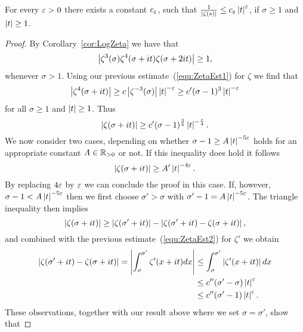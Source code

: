 \begin{proposition}
	For every $\varepsilon > 0$ there exists a constant $c_\varepsilon$, such that $\frac{1}{\left|\zeta(s)\right|} \leq c_\varepsilon \left|t\right|^\varepsilon$, if $\sigma \geq 1$ and $\left|t\right| \geq 1$.
\end{proposition}
\begin{proof}
	By Corollary~\ref{cor:LogZeta} we have that
\begin{equation*}
	\left|\zeta^3(\sigma) \zeta^4(\sigma + it) \zeta(\sigma + 2it)\right| \geq 1,
\end{equation*}
	whenever $\sigma > 1$. Using our previous estimate~(\ref{equ:ZetaEst1}) for $\zeta$ we find that
\begin{equation*}
	\left|\zeta^4(\sigma + it)\right| \geq c \left|\zeta^{-3}(\sigma)\right| \left|t\right|^{-\varepsilon} \geq c' (\sigma - 1)^3 \left|t\right|^{-\varepsilon}
\end{equation*}
	for all $\sigma \geq 1$ and $\left|t\right| \geq 1$. Thus
\begin{equation*}
	\left|\zeta(\sigma + it)\right| \geq c' (\sigma - 1)^{\frac{3}{4}} \left|t\right|^{-\frac{\varepsilon}{4}}.
\end{equation*}
	We now consider two cases, depending on whether $\sigma - 1 \geq A\left|t\right|^{-5 \varepsilon}$ holds for an appropriate constant $A \in \mathbb{R}_{> 0}$ or not. If this inequality does hold it follows
\begin{equation*}
	\left|\zeta(\sigma + it)\right| \geq A' \left|t\right|^{-4 \varepsilon}.
\end{equation*}
	By replacing $4 \varepsilon$ by $\varepsilon$ we can conclude the proof in this case. If, however, $\sigma - 1 < A\left|t\right|^{-5 \varepsilon}$ then we first choose $\sigma' > \sigma$ with $\sigma' - 1 = A \left|t\right|^{-5 \varepsilon}$. The triangle inequality then implies
\begin{equation*}
	\left|\zeta(\sigma + it)\right| \geq \left|\zeta(\sigma' + it)\right| - \left|\zeta(\sigma' + it) - \zeta(\sigma + it)\right|,
\end{equation*}
	and combined with the previous estimate~(\ref{equ:ZetaEst2}) for $\zeta'$ we obtain
\begin{equation*}
\begin{aligned}	
	\left|\zeta(\sigma' + it) - \zeta(\sigma + it)\right| = \left|\int _\sigma ^{\sigma'} \zeta'(x + it) dx\right|
	&\leq \int _\sigma ^{\sigma'} \left|\zeta'(x + it)\right| dx \\ 
	&\leq c'' (\sigma' - \sigma) \left|t\right|^{\varepsilon} \\
	&\leq c''(\sigma' - 1)\left|t\right|^{\varepsilon}.
\end{aligned}
\end{equation*}
	These observations, together with our result above where we set $\sigma = \sigma'$, show that

\end{proof}
